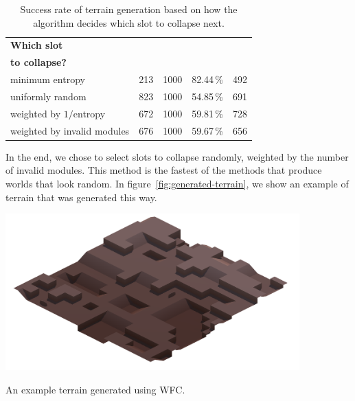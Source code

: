 \begin{table}[H]
    \centering
    \begin{tabular}{lrrD{.}{.}{-1}r}
        \toprule
        \textbf{Which slot}         &                          &                              & \mc{}                                &                             \\
        \textbf{to collapse?}       &  &  &  &  \\
        \midrule
        minimum entropy             & 213                      & 1000                         & 82.44\,\%                            & 492                         \\
        uniformly random            & 823                      & 1000                         & 54.85\,\%                            & 691                         \\
        weighted by $1/$entropy     & 672                      & 1000                         & 59.81\,\%                            & 728                         \\
        weighted by invalid modules & 676                      & 1000                         & 59.67\,\%                            & 656                         \\
        \bottomrule
    \end{tabular}
    \caption{Success rate of terrain generation based on how the algorithm decides which slot to collapse next. }
    \label{tab:wfc-collapsing}
\end{table}

In the end, we chose to select slots to collapse randomly, weighted by the number of invalid modules.
This method is the fastest of the methods that produce worlds that look random.
In figure~\ref{fig:generated-terrain}, we show an example of terrain that was generated this way.

\begin{center}
    \captionsetup{type=figure}
    \includegraphics[width=0.85\textwidth]{img/Generated Terrain.png}
    \caption{An example terrain generated using WFC.}
    \label{fig:generated-terrain}
\end{center}

